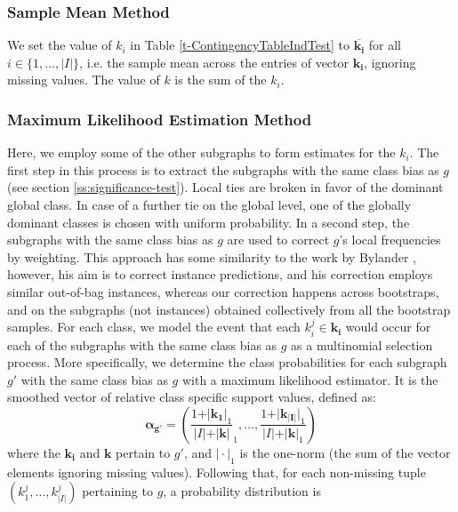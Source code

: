 \documentclass{sig-alternate}
\begin{document}
\subsubsection{Sample Mean Method}
\label{ss:simple-mean}
We set the value of $k_i$ in Table \ref{t-ContingencyTableIndTest} to
$\overline{\mathbf{k_i}}$ for all $i \in \{1,\ldots,|I|\}$, i.e. the sample mean
across the entries of vector $\mathbf{k_i}$, ignoring missing values. The
value of $k$ is the sum of the $k_i$.

\subsubsection{Maximum Likelihood Estimation Method}
\label{ss:MLE}
Here, we employ some of the other subgraphs to form estimates for the $k_i$.
The first step in this process is to extract the subgraphs with the same class
bias as $g$ (see section \ref{ss:significance-test}).  Local ties are broken in
favor of the dominant global class. In case of a further tie on the global
level, one of the globally dominant classes is chosen with uniform probability.
In a second step, the subgraphs with the same class bias as $g$ are used to correct
$g$'s local frequencies by weighting. This approach has some similarity to the
work by Bylander \cite{bylander02estimating}, however, his aim is to correct
instance predictions, and his correction employs similar out-of-bag instances,
whereas our correction happens across bootstraps, and on the subgraphs (not
instances) obtained collectively from all the bootstrap samples.  For each
class, we model the event that each $k_i^j \in \mathbf{k_i}$ would occur for
each of the subgraphs with the same class bias as $g$ as a multinomial
selection process.  More specifically, we determine the class probabilities for
each subgraph $g'$ with the same class bias as $g$ with a maximum likelihood
estimator. It is the smoothed vector of relative class specific support values,
defined as:
\begin{equation}
  \mathbf{\alpha_{g'}} = \left(\frac{1+\vert\mathbf{k_1}\vert_1}{\vert I\vert+\vert\mathbf{k}\vert}_1,\ldots,\frac{1+\vert\mathbf{k_{\vert I\vert}}\vert_1}{\vert I\vert+\vert\mathbf{k}\vert_1}\right)
  \label{eqn:mlexpr}
\end{equation}
where the $\mathbf{k_i}$ and $\mathbf{k}$ pertain to $g'$, and $\vert\cdot\vert_1$ is the one-norm (the sum of the vector elements ignoring missing values). Following that, for
each non-missing tuple $(k_1^j,\ldots,k_{\vert I\vert}^j)$ pertaining to $g$, a probability distribution is
\end{document}
